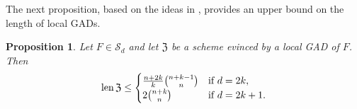 \documentclass{amsart}
\theoremstyle{plain}
\newtheorem{proposition}[proposition]{Proposition}
\renewcommand{\k}{\Bbbk}
\renewcommand{\S}{\mathcal{S}}
\newcommand{\len}{\textnormal{len}\,}
\newcommand{\contract}{\mathbin{\mathpalette\dointprod\relax}}
\newcommand{\dointprod}[2]{%
  \raisebox{\depth}{\scalebox{1}[-1]{$#1\lnot$}}}
\def\\k{{\mathsf{k}}}
\def\R{\mathcal{R}}
\def\Z{\mathfrak{Z}}
\numberwithin{equation}{section}
\begin{document}
The next proposition, based on the ideas in {\cite[Thm. 3]{BR13}}, provides an upper bound on the length of local GADs.
\begin{proposition} \label{prop:genericrank}
    Let $F \in \S_d$ and let $\Z$ be a scheme evinced by a local GAD of $F$. Then
    \[ \len \Z \leq \begin{cases} \frac{n+2k}{k}\binom{ n+k-1 }{n} & \textnormal{if } d = 2k, \\
    2\binom{ n+k }{n} & \textnormal{if } d = 2k+1.
    \end{cases}
    \]
\end{proposition}
\end{document}
